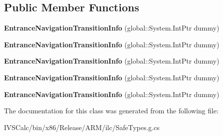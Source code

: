 \subsection*{Public Member Functions}
\begin{DoxyCompactItemize}
\item 
\mbox{\label{class_windows_1_1_u_i_1_1_xaml_1_1_media_1_1_animation_1_1_entrance_navigation_transition_info_af9d084c61923c1e7affd1a0f8ae314c1}} 
{\bfseries Entrance\+Navigation\+Transition\+Info} (global\+::\+System.\+Int\+Ptr dummy)
\item 
\mbox{\label{class_windows_1_1_u_i_1_1_xaml_1_1_media_1_1_animation_1_1_entrance_navigation_transition_info_af9d084c61923c1e7affd1a0f8ae314c1}} 
{\bfseries Entrance\+Navigation\+Transition\+Info} (global\+::\+System.\+Int\+Ptr dummy)
\item 
\mbox{\label{class_windows_1_1_u_i_1_1_xaml_1_1_media_1_1_animation_1_1_entrance_navigation_transition_info_af9d084c61923c1e7affd1a0f8ae314c1}} 
{\bfseries Entrance\+Navigation\+Transition\+Info} (global\+::\+System.\+Int\+Ptr dummy)
\item 
\mbox{\label{class_windows_1_1_u_i_1_1_xaml_1_1_media_1_1_animation_1_1_entrance_navigation_transition_info_af9d084c61923c1e7affd1a0f8ae314c1}} 
{\bfseries Entrance\+Navigation\+Transition\+Info} (global\+::\+System.\+Int\+Ptr dummy)
\item 
\mbox{\label{class_windows_1_1_u_i_1_1_xaml_1_1_media_1_1_animation_1_1_entrance_navigation_transition_info_af9d084c61923c1e7affd1a0f8ae314c1}} 
{\bfseries Entrance\+Navigation\+Transition\+Info} (global\+::\+System.\+Int\+Ptr dummy)
\end{DoxyCompactItemize}


The documentation for this class was generated from the following file\+:\begin{DoxyCompactItemize}
\item 
I\+V\+S\+Calc/bin/x86/\+Release/\+A\+R\+M/ilc/Safe\+Types.\+g.\+cs\end{DoxyCompactItemize}
